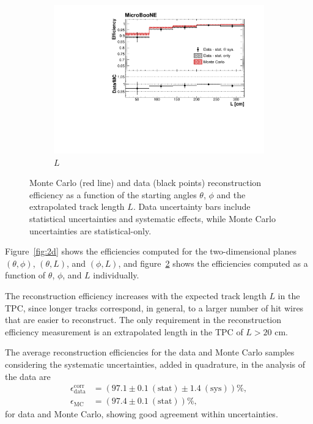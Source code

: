 \documentclass[a4paper,11pt]{article}
\begin{document}
\begin{figure}[htbp]
\begin{center}
\begin{subfigure}{0.61\textwidth}
      \includegraphics[width=\linewidth]{figures/l.pdf}
      \caption{$L$} \label{fig:l}
    \end{subfigure}
    \caption{Monte Carlo (red line) and data (black points) reconstruction efficiency as a function of the starting angles $\theta$, $\phi$ and the extrapolated track length $L$. Data uncertainty bars include statistical uncertainties and systematic effects, while Monte Carlo uncertainties are statistical-only.}\label{fig:1d}
  \end{center}
\end{figure}

Figure~\ref{fig:2d} shows the efficiencies computed for the two-dimensional planes $(\theta,\phi)$, $(\theta,L)$, and $(\phi,L)$, and figure~\ref{fig:1d} shows the efficiencies computed as a function of $\theta$, $\phi$, and $L$ individually.

The reconstruction efficiency increases with the expected track length $L$ in the TPC, since longer tracks correspond, in general, to a larger number of hit wires that are easier to reconstruct. The only requirement in the reconstruction efficiency measurement is an extrapolated length in the TPC of $L > 20$ cm.

The average reconstruction efficiencies for the data and Monte Carlo samples considering the systematic uncertainties, added in quadrature, in the analysis of the data are
\begin{align}
\epsilon_{\mathrm{data}}^{\mathrm{corr}} &= (97.1 \pm 0.1~\mathrm{(stat)} \pm 1.4~\mathrm{(sys)})\%,\\
\epsilon_{\mathrm{MC}} &= (97.4 \pm 0.1~\mathrm{(stat)})\%,\nonumber
\end{align} for data and Monte Carlo, showing good agreement within uncertainties.
\end{document}
